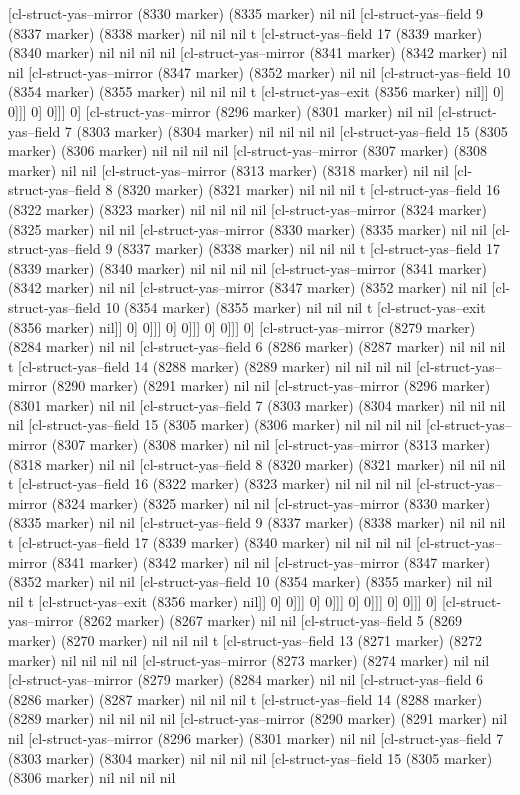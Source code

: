 {{[cl-struct-yas--mirror (8330 marker) (8335 marker) nil nil [cl-struct-yas--field 9 (8337 marker) (8338 marker) nil nil nil t [cl-struct-yas--field 17 (8339 marker) (8340 marker) nil nil nil nil [cl-struct-yas--mirror (8341 marker) (8342 marker) nil nil [cl-struct-yas--mirror (8347 marker) (8352 marker) nil nil [cl-struct-yas--field 10 (8354 marker) (8355 marker) nil nil nil t [cl-struct-yas--exit (8356 marker) nil]] 0] 0]]] 0] 0]]] 0] [cl-struct-yas--mirror (8296 marker) (8301 marker) nil nil [cl-struct-yas--field 7 (8303 marker) (8304 marker) nil nil nil nil [cl-struct-yas--field 15 (8305 marker) (8306 marker) nil nil nil nil [cl-struct-yas--mirror (8307 marker) (8308 marker) nil nil [cl-struct-yas--mirror (8313 marker) (8318 marker) nil nil [cl-struct-yas--field 8 (8320 marker) (8321 marker) nil nil nil t [cl-struct-yas--field 16 (8322 marker) (8323 marker) nil nil nil nil [cl-struct-yas--mirror (8324 marker) (8325 marker) nil nil [cl-struct-yas--mirror (8330 marker) (8335 marker) nil nil [cl-struct-yas--field 9 (8337 marker) (8338 marker) nil nil nil t [cl-struct-yas--field 17 (8339 marker) (8340 marker) nil nil nil nil [cl-struct-yas--mirror (8341 marker) (8342 marker) nil nil [cl-struct-yas--mirror (8347 marker) (8352 marker) nil nil [cl-struct-yas--field 10 (8354 marker) (8355 marker) nil nil nil t [cl-struct-yas--exit (8356 marker) nil]] 0] 0]]] 0] 0]]] 0] 0]]] 0] [cl-struct-yas--mirror (8279 marker) (8284 marker) nil nil [cl-struct-yas--field 6 (8286 marker) (8287 marker) nil nil nil t [cl-struct-yas--field 14 (8288 marker) (8289 marker) nil nil nil nil [cl-struct-yas--mirror (8290 marker) (8291 marker) nil nil [cl-struct-yas--mirror (8296 marker) (8301 marker) nil nil [cl-struct-yas--field 7 (8303 marker) (8304 marker) nil nil nil nil [cl-struct-yas--field 15 (8305 marker) (8306 marker) nil nil nil nil [cl-struct-yas--mirror (8307 marker) (8308 marker) nil nil [cl-struct-yas--mirror (8313 marker) (8318 marker) nil nil [cl-struct-yas--field 8 (8320 marker) (8321 marker) nil nil nil t [cl-struct-yas--field 16 (8322 marker) (8323 marker) nil nil nil nil [cl-struct-yas--mirror (8324 marker) (8325 marker) nil nil [cl-struct-yas--mirror (8330 marker) (8335 marker) nil nil [cl-struct-yas--field 9 (8337 marker) (8338 marker) nil nil nil t [cl-struct-yas--field 17 (8339 marker) (8340 marker) nil nil nil nil [cl-struct-yas--mirror (8341 marker) (8342 marker) nil nil [cl-struct-yas--mirror (8347 marker) (8352 marker) nil nil [cl-struct-yas--field 10 (8354 marker) (8355 marker) nil nil nil t [cl-struct-yas--exit (8356 marker) nil]] 0] 0]]] 0] 0]]] 0] 0]]] 0] 0]]] 0] [cl-struct-yas--mirror (8262 marker) (8267 marker) nil nil [cl-struct-yas--field 5 (8269 marker) (8270 marker) nil nil nil t [cl-struct-yas--field 13 (8271 marker) (8272 marker) nil nil nil nil [cl-struct-yas--mirror (8273 marker) (8274 marker) nil nil [cl-struct-yas--mirror (8279 marker) (8284 marker) nil nil [cl-struct-yas--field 6 (8286 marker) (8287 marker) nil nil nil t [cl-struct-yas--field 14 (8288 marker) (8289 marker) nil nil nil nil [cl-struct-yas--mirror (8290 marker) (8291 marker) nil nil [cl-struct-yas--mirror (8296 marker) (8301 marker) nil nil [cl-struct-yas--field 7 (8303 marker) (8304 marker) nil nil nil nil [cl-struct-yas--field 15 (8305 marker) (8306 marker) nil nil nil nil }}
